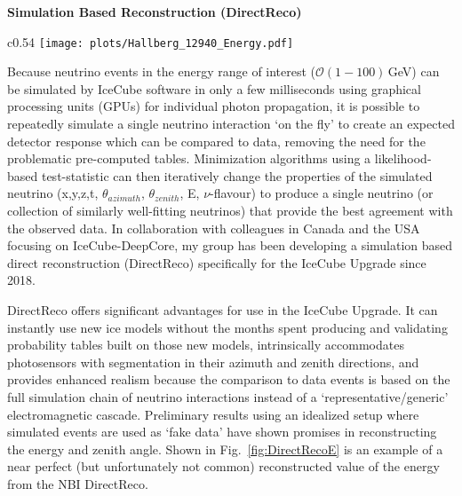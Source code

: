 \documentclass[a4paper,11pt]{article}
\begin{document}
\textbf{Simulation Based Reconstruction (DirectReco)}

\begin{wrapfigure}[18]{c}{0.54\textwidth}
\vspace{-0.5cm}
\centering
\texttt{[image: plots/Hallberg\_12940\_Energy.pdf]}
\caption{\label{fig:DirectRecoE} A simulated 36\,GeV CC-$\nu_e$ interaction in the IceCube Upgrade reconstructed using DirectReco\cite{Halberg2019}. The color scale indicates the value of the log-likelihood.}
\end{wrapfigure} 

Because neutrino events in the energy range of interest ($\mathcal{O}(1-100)$\,GeV) can be simulated by IceCube software in only a few milliseconds using graphical processing units (GPUs) for individual photon propagation, it is possible to repeatedly simulate a single neutrino interaction `on the fly' to create an expected detector response which can be compared to data, removing the need for the problematic pre-computed tables. Minimization algorithms using a likelihood-based test-statistic can then iteratively change the properties of the simulated neutrino (x,y,z,t, $\theta_{azimuth}$, $\theta_{zenith}$, E, $\nu$-flavour) to produce a single neutrino (or collection of similarly well-fitting neutrinos) that provide the best agreement with the observed data. In collaboration with colleagues in Canada and the USA focusing on IceCube-DeepCore, my group has been developing a simulation based direct reconstruction (DirectReco) specifically for the IceCube Upgrade since 2018.

DirectReco offers significant advantages for use in the IceCube Upgrade. It can instantly use new ice models without the months spent producing and validating probability tables built on those new models, intrinsically accommodates photosensors with segmentation in their azimuth and zenith directions, and provides enhanced realism because the comparison to data events is based on the full simulation chain of neutrino interactions instead of a `representative/generic' electromagnetic cascade. Preliminary results using an idealized setup where simulated events are used as `fake data' have shown promises in reconstructing the energy and zenith angle. Shown in Fig.~\ref{fig:DirectRecoE} is an example of a near perfect (but unfortunately not common) reconstructed value of the energy from the NBI DirectReco.
\end{document}

